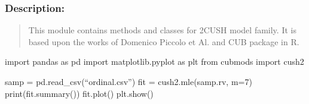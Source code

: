 \documentclass[letterpaper,10pt,english]{sphinxmanual}
\begin{document}
\subsubsection{Description:}
\label{\detokenize{cubmods:id200}}\begin{quote}

\sphinxAtStartPar
This module contains methods and classes
for 2\sphinxhyphen{}CUSH model family.
It is based upon the works of Domenico
Piccolo et Al. and CUB package in R.
\end{quote}
\begin{description}
\sphinxAtStartPar
import pandas as pd
import matplotlib.pyplot as plt
from cubmods import cush2

\sphinxAtStartPar
samp = pd.read\_csv(“ordinal.csv”)
fit = cush2.mle(samp.rv, m=7)
print(fit.summary())
fit.plot()
plt.show()

\end{description}
\end{document}
